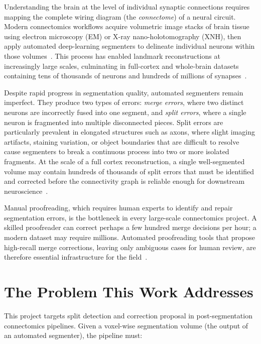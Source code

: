 Understanding the brain at the level of individual synaptic connections requires
mapping the complete wiring diagram (the \emph{connectome}) of a neural
circuit. Modern connectomics workflows acquire volumetric image stacks of brain
tissue using electron microscopy (EM) or X-ray nano-holotomography (XNH), then
apply automated deep-learning segmenters to delineate individual neurons within
those volumes~\cite{januszewski2018high,lin2021pytorch}. This process has enabled
landmark reconstructions at increasingly large scales, culminating in full-cortex
and whole-brain datasets containing tens of thousands of neurons and hundreds of
millions of synapses~\cite{microns2025}.

Despite rapid progress in segmentation quality, automated segmenters remain
imperfect. They produce two types of errors: \emph{merge errors}, where
two distinct neurons are incorrectly fused into one segment, and \emph{split errors},
where a single neuron is fragmented into multiple disconnected pieces. Split
errors are particularly prevalent in elongated structures such as axons, where
slight imaging artifacts, staining variation, or object boundaries that are
difficult to resolve cause segmenters to break a continuous process into two or
more isolated fragments. At the scale of a full cortex reconstruction, a single
well-segmented volume may contain hundreds of thousands of split errors that must
be identified and corrected before the connectivity graph is reliable
enough for downstream neuroscience~\cite{plaza2018analyzing}.

Manual proofreading, which requires human experts to identify and repair segmentation
errors, is the bottleneck in every large-scale connectomics project. A skilled
proofreader can correct perhaps a few hundred merge decisions per hour; a modern
dataset may require millions. Automated proofreading tools that propose high-recall
merge corrections, leaving only ambiguous cases for human review, are therefore
essential infrastructure for the field~\cite{dorkenwald2025cave}.

\section*{The Problem This Work Addresses}

This project targets split detection and correction proposal in
post-segmentation connectomics pipelines. Given a voxel-wise segmentation
volume (the output of an automated segmenter), the pipeline must:

